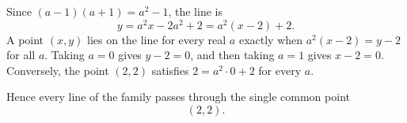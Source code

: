 Since $(a-1)(a+1)=a^2-1$, the line is
\[y=a^2x-2a^2+2=a^2(x-2)+2.\]
A point $(x,y)$ lies on the line for every real $a$ exactly when $a^2(x-2)=y-2$ for all $a$. Taking $a=0$ gives $y-2=0$, and then taking $a=1$ gives $x-2=0$. Conversely, the point $(2,2)$ satisfies $2=a^2\cdot0+2$ for every $a$.

Hence every line of the family passes through the single common point
\[\boxed{(2,2)}.\]
